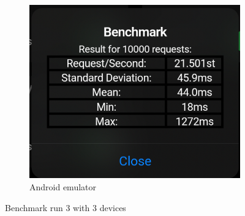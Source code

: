 \begin{figure}[H]
\begin{subfigure}{0.48\textwidth}
        \label{fig:bench3:dev2}
    \end{subfigure}  
    \begin{subfigure}{0.48\textwidth}
        \centering
        \includegraphics[width=1\textwidth]{img/Run3Dev3.png}
        \caption{Android emulator}
        \label{fig:bench3:dev3}
    \end{subfigure} 
    \caption{Benchmark run 3 with 3 devices}
    \label{fig:bench3}
\end{figure}
